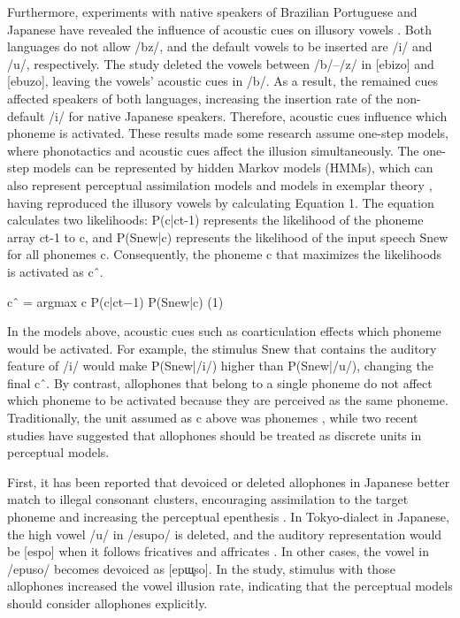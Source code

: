 \documentclass[a4paper,11pt,twocolumn]{article}
\begin{document}
Furthermore, experiments with native speakers of Brazilian Portuguese and Japanese have revealed the influence of acoustic cues on illusory vowels \cite{dupoux2011}. Both languages do not allow /bz/, and the default vowels to be inserted are /i/ and /u/, respectively. The study deleted the vowels between /b/--/z/ in [ebizo] and [ebuzo], leaving the vowels’ acoustic cues in /b/. As a result, the remained cues affected speakers of both languages, increasing the insertion rate of the non-default /i/ for native Japanese speakers. Therefore, acoustic cues influence which phoneme is activated.
These results made some research assume one-step models, where phonotactics and acoustic cues affect the illusion simultaneously. The one-step models can be represented by hidden Markov models (HMMs), which can also represent perceptual assimilation models \cite{pam} and models in exemplar theory \cite{et}, having reproduced the illusory vowels \cite{kishiyama2021} by calculating Equation 1. The equation calculates two likelihoods: P(c|ct-1) represents the likelihood of the phoneme array ct-1 to c, and P(Snew|c) represents the likelihood of the input speech Snew for all phonemes c. Consequently, the phoneme c that maximizes the likelihoods is activated as cˆ.

cˆ = argmax c P(c|ct−1) P(Snew|c)		(1)

In the models above, acoustic cues such as coarticulation effects which phoneme would be activated. For example, the stimulus Snew that contains the auditory feature of /i/ would make P(Snew|/i/) higher than P(Snew|/u/), changing the final cˆ. By contrast, allophones that belong to a single phoneme do not affect which phoneme to be activated because they are perceived as the same phoneme. Traditionally, the unit assumed as c above was phonemes \cite{wilson}, while two recent studies have suggested that allophones should be treated as discrete units in perceptual models.

First, it has been reported that devoiced or deleted allophones in Japanese better match to illegal consonant clusters, encouraging assimilation to the target phoneme and increasing the perceptual epenthesis \cite{kilpatric2018}. In Tokyo-dialect in Japanese, the high vowel /u/ in /esupo/ is deleted, and the auditory representation would be [espo] when it follows fricatives and affricates \cite{fujimoto, shaw}. In other cases, the vowel in /epuso/ becomes devoiced as [epɯ̥so]. In the study, stimulus with those allophones increased the vowel illusion rate, indicating that the perceptual models should consider allophones explicitly. 
\end{document}
